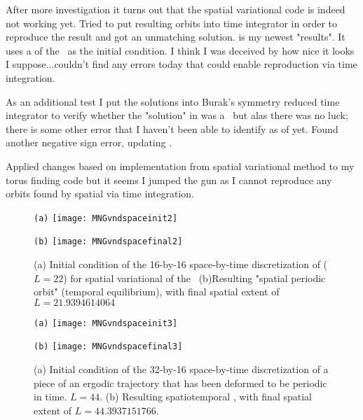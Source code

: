 After more investigation it turns out that the spatial variational code is indeed not working yet. Tried to put
resulting orbits into time integrator in order to reproduce the result and got an unmatching solution.
 is my
newest "results". It uses a  of the \KSe\ as the initial condition. I think I was deceived by how nice it looks
I suppose...couldn't find any errors today that could enable reproduction via time integration.

As an additional test I put the solutions into Burak's symmetry reduced time integrator to verify whether
the "solution" in  was a \rpo\ but alas there was no luck; there is some other error
that I haven't been able to identify as of yet.
Found another negative sign error, updating .

Applied changes based on implementation from spatial variational method to my torus finding code but it seems
I jumped the gun as I cannot reproduce any orbits found by spatial {\descent} via time integration.

\begin{figure}[ht]
\begin{minipage}[height=.32\textheight]{.45\textwidth}
\centering \small{\texttt{(a)}}
\texttt{[image: MNGvndspaceinit2]}
\end{minipage}
\begin{minipage}[height=.32\textheight]{.45\textwidth}
\centering \small{\texttt{(b)}}
\texttt{[image: MNGvndspacefinal2]}
\end{minipage}
\caption{ \label{fig:MNGvndspace2}
(a) Initial condition of the 16-by-16 space-by-time discretization of  ($L=22$) for spatial
variational {\descent} of the \KSe\ (b)Resulting "spatial periodic orbit" (temporal equilibrium), with
final spatial extent of $L = 21.9394614064$
}
\end{figure}
\begin{figure}[ht]
\begin{minipage}[height=.32\textheight]{.45\textwidth}
\centering \small{\texttt{(a)}}
\texttt{[image: MNGvndspaceinit3]}
\end{minipage}
\begin{minipage}[height=.32\textheight]{.45\textwidth}
\centering \small{\texttt{(b)}}
\texttt{[image: MNGvndspacefinal3]}
\end{minipage}
\caption{ \label{fig:MNGvndspace3}
(a) Initial condition of the 32-by-16 space-by-time discretization of a piece
of an ergodic trajectory that has been deformed to be periodic in time. $L=44$.
(b) Resulting spatiotemporal \po, with
final spatial extent of $L = 44.3937151766$.
}
\end{figure}


